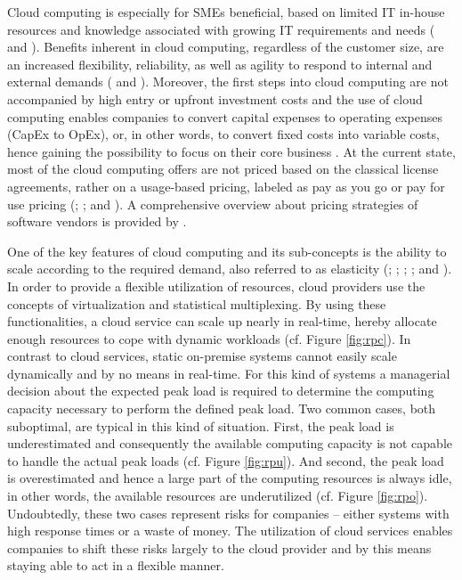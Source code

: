 Cloud computing is especially for \acp{SME} beneficial, based on limited \ac{IT} in-house resources and knowledge associated with growing \ac{IT} requirements and needs (\citealp[p. 398]{Weinhardt2009} and \citealp{Karabek2011}). Benefits inherent in cloud computing, regardless of the customer size, are an increased flexibility, reliability, as well as agility to respond to internal and external demands (\citealp[p. 51]{Vaquero2009} and \citealp[p. 129]{Iyer2010}). Moreover, the first steps into cloud computing are not accompanied by high entry or upfront investment costs and the use of cloud computing enables companies to convert capital expenses to operating expenses (CapEx to OpEx), or, in other words, to convert fixed costs into variable costs, hence gaining the possibility to focus on their core business \citep[pp. 51-53]{Armbrust2010}. At the current state, most of the cloud computing offers are not priced based on the classical license agreements, rather on a usage-based pricing, labeled as pay as you go or pay for use pricing (\citealp[pp. 50-54]{Vaquero2009}; \citealp[pp. 51-53,58]{Armbrust2010}; and \citealp[p. 2]{Iyer2010}). A comprehensive overview about pricing strategies of software vendors is provided by \citet{Lehmann2009}.

One of the key features of cloud computing and its sub-concepts is the ability to scale according to the required demand, also referred to as elasticity (\citealp[p. 4]{Foster2008}; \citealp[pp. 52-54]{Armbrust2010}; \citealp[p. 126]{Iyer2010}; \citealp[pp. 9-10]{Zhang2010}; and \citealp[p. 2]{Mell2011}). In order to provide a flexible utilization of resources, cloud providers use the concepts of virtualization and statistical multiplexing. By using these functionalities, a cloud service can scale up nearly in real-time, hereby allocate enough resources to cope with dynamic workloads (cf. Figure \ref{fig:rpc}). In contrast to cloud services, static on-premise systems cannot easily scale dynamically and by no means in real-time. For this kind of systems a managerial decision about the expected peak load is required to determine the computing capacity necessary to perform the defined peak load. Two common cases, both suboptimal, are typical in this kind of situation. First, the peak load is underestimated and consequently the available computing capacity is not capable to handle the actual peak loads (cf. Figure \ref{fig:rpu}). And second, the peak load is overestimated and hence a large part of the computing resources is always idle, in other words, the available resources are underutilized (cf. Figure \ref{fig:rpo}). Undoubtedly, these two cases represent risks for companies -- either systems with high response times or a waste of money. The utilization of cloud services enables companies to shift these risks largely to the cloud provider and by this means staying able to act in a flexible manner.

